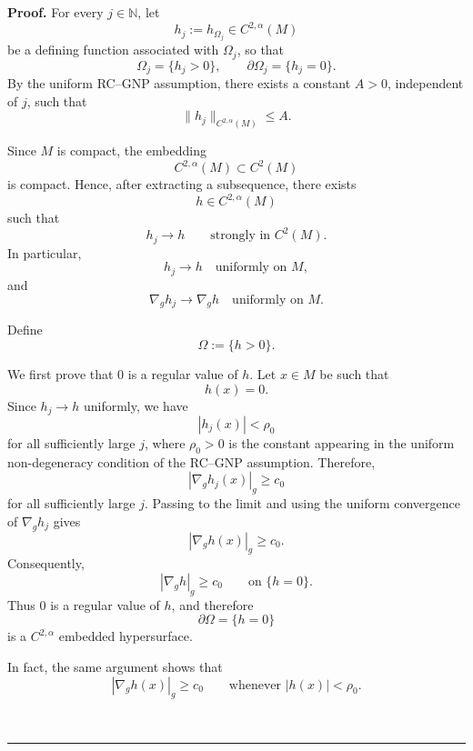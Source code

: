 \documentclass{article}
\newenvironment{proof}[1][Proof]{\textbf{#1.} }{\ \rule{0.5em}{0.5em}}
\begin{document}
\begin{proof}
For every $j\in\mathbb N$, let
\[
h_j:=h_{\Omega_j}\in C^{2,\alpha}(M)
\]
be a defining function associated with $\Omega_j$, so that
\begin{equation}
\Omega_j=\{h_j>0\},
\qquad
\partial\Omega_j=\{h_j=0\}.
\label{eq:compactness-defining-functions}
\end{equation}
By the uniform RC--GNP assumption, there exists a constant
$A>0$, independent of $j$, such that
\begin{equation}
\|h_j\|_{C^{2,\alpha}(M)}\le A.
\label{eq:compactness-uniform-C2alpha}
\end{equation}

Since $M$ is compact, the embedding
\[
C^{2,\alpha}(M)\subset C^2(M)
\]
is compact. Hence, after extracting a subsequence, there exists
\[
h\in C^{2,\alpha}(M)
\]
such that
\begin{equation}
h_j\longrightarrow h
\qquad\text{strongly in }C^2(M).
\label{eq:compactness-C2-convergence}
\end{equation}
In particular,
\[
h_j\longrightarrow h
\quad\text{uniformly on }M,
\]
and
\[
\nabla_g h_j\longrightarrow\nabla_g h
\quad\text{uniformly on }M.
\]

Define
\begin{equation}
\Omega:=\{h>0\}.
\label{eq:compactness-limit-domain}
\end{equation}

We first prove that $0$ is a regular value of $h$. Let
$x\in M$ be such that
\[
h(x)=0.
\]
Since $h_j\to h$ uniformly, we have
\[
|h_j(x)|<\rho_0
\]
for all sufficiently large $j$, where $\rho_0>0$ is the constant
appearing in the uniform non-degeneracy condition of the RC--GNP
assumption. Therefore,
\[
|\nabla_g h_j(x)|_g\ge c_0
\]
for all sufficiently large $j$. Passing to the limit and using the
uniform convergence of $\nabla_g h_j$ gives
\[
|\nabla_g h(x)|_g\ge c_0.
\]
Consequently,
\begin{equation}
|\nabla_g h|_g\ge c_0
\qquad\text{on }\{h=0\}.
\label{eq:compactness-limit-nondegeneracy}
\end{equation}
Thus $0$ is a regular value of $h$, and therefore
\[
\partial\Omega=\{h=0\}
\]
is a $C^{2,\alpha}$ embedded hypersurface.

In fact, the same argument shows that
\begin{equation}
|\nabla_g h(x)|_g\ge c_0
\qquad
\text{whenever }|h(x)|<\rho_0.
\label{eq:compactness-limit-nondegeneracy-neighborhood}
\end{equation}


\end{proof}
\end{document}
